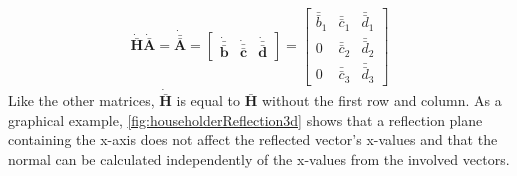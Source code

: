 \begin{align}
\mathbf{\dot{\bar{H}}}\mathbf{\dot{\bar{A}}}
= 
\mathbf{\dot{\bar{\bar{A}}}}
=
\begin{bmatrix}
\mathbf{\dot{\bar{\bar{b}}}}&\mathbf{\dot{\bar{\bar{c}}}}&\mathbf{\dot{\bar{\bar{d}}}}
\end{bmatrix}	
=
\begin{bmatrix}
\bar{\bar{b}}_1&\bar{\bar{c}}_1&\bar{\bar{d}}_1\\
0              &\bar{\bar{c}}_2&\bar{\bar{d}}_2\\
0              &\bar{\bar{c}}_3&\bar{\bar{d}}_3
\end{bmatrix}					  
\end{align}
%
Like the other matrices, $\mathbf{\dot{\bar{H}}}$ is equal to $\mathbf{\bar{H}}$ without the first row and column.
As a graphical example, \cref{fig:householderReflection3d} shows that a reflection plane containing the x-axis  does not affect the reflected vector's x-values and that the normal can be calculated independently of the x-values from the involved vectors.
%
